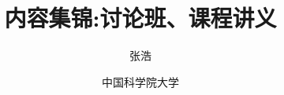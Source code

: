 
\usepackage{calrsfs} %
\usepackage{stmaryrd}%

\title{内容集锦:讨论班、课程讲义}
\author{张浩}
\date{中国科学院大学}
\maketitle
\tableofcontents


% 
% 
% 
% 
% 
% 
% 
% 
% 
% 
% 

\printindex



